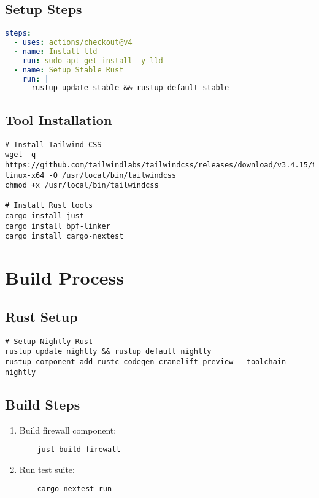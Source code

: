\documentclass{article}
\begin{document}
\subsection{Setup Steps}
\begin{lstlisting}[language=yaml]
steps:
  - uses: actions/checkout@v4
  - name: Install lld
    run: sudo apt-get install -y lld
  - name: Setup Stable Rust
    run: |
      rustup update stable && rustup default stable
\end{lstlisting}

\subsection{Tool Installation}
\begin{verbatim}
# Install Tailwind CSS
wget -q https://github.com/tailwindlabs/tailwindcss/releases/download/v3.4.15/tailwindcss-linux-x64 -O /usr/local/bin/tailwindcss
chmod +x /usr/local/bin/tailwindcss

# Install Rust tools
cargo install just
cargo install bpf-linker
cargo install cargo-nextest
\end{verbatim}

\section{Build Process}

\subsection{Rust Setup}
\begin{verbatim}
# Setup Nightly Rust
rustup update nightly && rustup default nightly
rustup component add rustc-codegen-cranelift-preview --toolchain nightly
\end{verbatim}

\subsection{Build Steps}
\begin{enumerate}
    \item Build firewall component:
    \begin{verbatim}
    just build-firewall
    \end{verbatim}
    \item Run test suite:
    \begin{verbatim}
    cargo nextest run
    \end{verbatim}
\end{enumerate}
\end{document}
